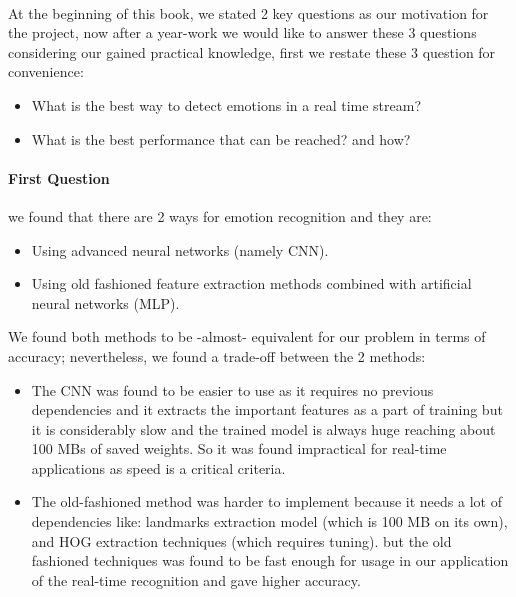 \paragraph{}
At the beginning of this book, we stated 2 key questions as our motivation for the project, now after a year-work we would like to answer these 3 questions considering our gained practical knowledge, first we restate these 3 question for convenience:
\begin{itemize}
	\item  What is the best way to detect emotions in a real time stream?
	\item  What is the best performance that can be reached? and how?
\end{itemize}

\paragraph{First Question}
we found that there are 2 ways for emotion recognition and they are:
\begin{itemize}
	\item  Using advanced neural networks (namely CNN).
	\item  Using old fashioned feature extraction methods combined with artificial neural networks (MLP).
\end{itemize}

We found both methods to be -almost- equivalent for our problem in terms of accuracy;
nevertheless, we found a trade-off between the 2 methods:
\begin{itemize}
	\item The CNN was found to be easier to use as it requires no previous dependencies and it extracts the important features as a part of training but it is considerably slow and the trained model is always huge reaching about 100 MBs of saved weights. So it was found impractical for real-time applications as speed is a critical criteria.
	\item The old-fashioned method was harder to implement because it needs a lot of dependencies like: landmarks extraction model (which is 100 MB on its own), and HOG extraction techniques (which requires tuning). but the old fashioned techniques was found to be fast enough for usage in our application of the real-time recognition and gave higher accuracy.
\end{itemize}

